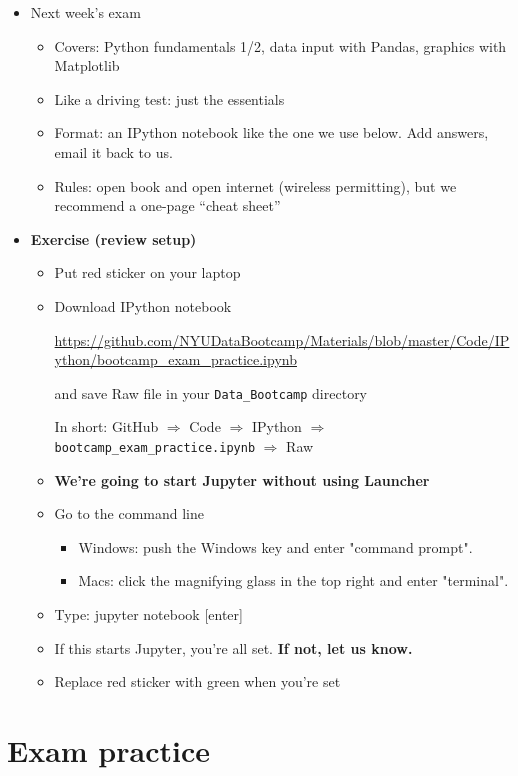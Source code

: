 \documentclass[11pt]{article}
\begin{document}
\begin{itemize}
\item Next week's exam
\begin{itemize}
\item Covers:  Python fundamentals 1/2, data input with Pandas, graphics with Matplotlib
\item Like a driving test:  just the essentials
\item Format:  an IPython notebook like the one we use below.  Add answers, email it back to us.
\item Rules:  open book and open internet (wireless permitting), but we recommend a one-page ``cheat sheet''
\end{itemize}

\item {\bf Exercise (review setup)}
\begin{itemize}
\item Put red sticker on your laptop

\item Download IPython notebook

\url{https://github.com/NYUDataBootcamp/Materials/blob/master/Code/IPython/bootcamp_exam_practice.ipynb} %

and save Raw file in your \verb|Data_Bootcamp| directory

In short:  GitHub $\Rightarrow$ Code $\Rightarrow$ IPython $\Rightarrow$ \verb|bootcamp_exam_practice.ipynb|
$\Rightarrow$ Raw

\item {\bf We're going to start Jupyter without using Launcher}
\item Go to the command line
\begin{itemize}
\item Windows:  push the Windows key and enter "command prompt".
\item Macs:  click the magnifying glass in the top right and enter "terminal".
\end{itemize}
\item Type:  jupyter notebook [enter]
\item If this starts Jupyter, you're all set.  {\bf If not, let us know.}
\item Replace red sticker with green when you're set
\end{itemize}

\end{itemize}


\section*{Exam practice}
\end{document}
